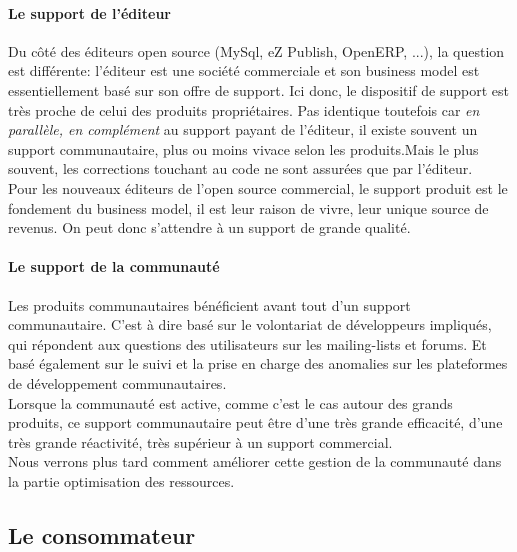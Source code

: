 				\paragraph{Le support de l'éditeur\\}

				Du côté des éditeurs open source (MySql, eZ Publish, OpenERP, ...), la question est différente: l'éditeur est une société commerciale et son business model est essentiellement basé sur son offre de support. Ici donc, le dispositif de support est très proche de celui des produits propriétaires. Pas identique toutefois car \textit{en parallèle, en complément} au support payant de l'éditeur, il existe souvent un support communautaire, plus ou moins vivace selon les produits.Mais le plus souvent, les corrections touchant au code ne sont assurées que par l'éditeur.\\

				Pour les nouveaux éditeurs de l'open source commercial, le support produit est le fondement du business model, il est leur raison de vivre, leur unique source de revenus. On peut donc s'attendre à un support de grande qualité.

				\paragraph{Le support de la communauté\\}

				Les produits communautaires bénéficient avant tout d'un support communautaire. C'est à dire basé sur le volontariat de développeurs impliqués, qui répondent aux questions des utilisateurs sur les mailing-lists et forums. Et basé également sur le suivi et la prise en charge des anomalies sur les plateformes de développement communautaires.\\

				Lorsque la communauté est active, comme c'est le cas autour des grands produits, ce support communautaire peut être d'une très grande efficacité, d'une très grande réactivité, très supérieur à un support commercial.\\

				Nous verrons plus tard comment améliorer cette gestion de la communauté dans la partie optimisation des ressources.

		\subsection{Le consommateur}

